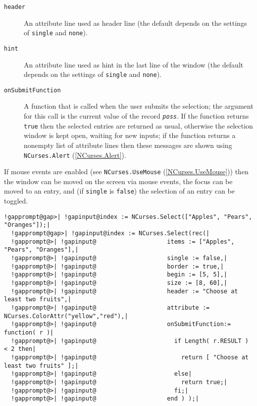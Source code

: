 \documentclass[a4paper,11pt]{report}
\begin{document}
{{{\begin{description}
\item[{\texttt{header}}] An attribute line used as header line (the default depends on the settings of \texttt{single} and \texttt{none}).
\item[{\texttt{hint}}] An attribute line used as hint in the last line of the window (the default
depends on the settings of \texttt{single} and \texttt{none}).
\item[{\texttt{onSubmitFunction}}]  A function that is called when the user submits the selection; the argument
for this call is the current value of the record \mbox{\texttt{\mdseries\slshape poss}}. If the function returns \texttt{true} then the selected entries are returned as usual, otherwise the selection
window is kept open, waiting for new inputs; if the function returns a
nonempty list of attribute lines then these messages are shown using \texttt{NCurses.Alert} (\ref{NCurses.Alert}). 
\end{description}
 

 If mouse events are enabled (see \texttt{NCurses.UseMouse} (\ref{NCurses.UseMouse})) then the window can be moved on the screen via mouse events, the focus can be
moved to an entry, and (if \texttt{single} is \texttt{false}) the selection of an entry can be toggled. 

 
\begin{Verbatim}[commandchars=!@|,fontsize=\small,frame=single,label=Example]
  !gapprompt@gap>| !gapinput@index := NCurses.Select(["Apples", "Pears", "Oranges"]);|
  !gapprompt@gap>| !gapinput@index := NCurses.Select(rec(|
  !gapprompt@>| !gapinput@                    items := ["Apples", "Pears", "Oranges"],|
  !gapprompt@>| !gapinput@                    single := false,|
  !gapprompt@>| !gapinput@                    border := true,|
  !gapprompt@>| !gapinput@                    begin := [5, 5],|
  !gapprompt@>| !gapinput@                    size := [8, 60],|
  !gapprompt@>| !gapinput@                    header := "Choose at least two fruits",|
  !gapprompt@>| !gapinput@                    attribute := NCurses.ColorAttr("yellow","red"),|
  !gapprompt@>| !gapinput@                    onSubmitFunction:= function( r )|
  !gapprompt@>| !gapinput@                      if Length( r.RESULT ) < 2 then|
  !gapprompt@>| !gapinput@                        return [ "Choose at least two fruits" ];|
  !gapprompt@>| !gapinput@                      else|
  !gapprompt@>| !gapinput@                        return true;|
  !gapprompt@>| !gapinput@                      fi;|
  !gapprompt@>| !gapinput@                    end ) );|
\end{Verbatim}
 }

}}
\end{document}
